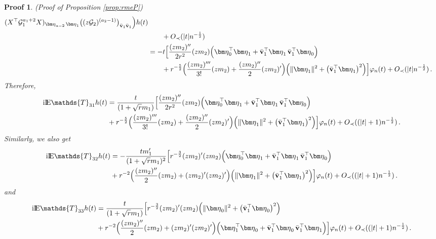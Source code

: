 \documentclass[12pt]{article}
\numberwithin{equation}{section}
\newtheorem{myPro}{Proof}
\theoremstyle{remark}
\newcommand{\1}{{\rm 1}\kern-0.24em{\rm I}}
\newcommand{\E}{{\rm I}\kern-0.18em{\rm E}}
\begin{document}
\begin{appendices}
\begin{myPro}{(Proof of Proposition  \ref{prop:rmeP})}
{\begin{align*}
({X}^{\top} \mathcal{G}_1^{a_1+2}{X})_{ {\bm \eta}_{a-2}\, {\bm \eta}_1} \big( (z\mathcal{G}_2)^{(a_2-1)}\big)_{\bar{\bf v}_1 \bar{\bf v}_1 } \Big)h(t) \notag\\
&\qquad + O_\prec(|t|n^{-\frac 12})\nonumber\\
&= - t\Big[ \frac{(zm_2)''}{2r^2} (zm_2) \Big( {\bm \eta}_{0}^{\top} {\bm \eta}_1+ \bar{\bf v}_1^{\top} {\bm \eta}_1\, \bar{\bf v}_1^{\top} {\bm \eta}_{0}\Big) \notag\\
&\qquad + r^{-\frac 52}\Big( \frac{(zm_2)'''}{3!} (zm_2)  + \frac{(zm_2)''}{2} (zm_2)'  \Big) \Big( \Vert {\bm \eta}_{1}\Vert^2+\big( \bar{\bf v}_1^{\top} {\bm \eta}_1\big)^2 \Big)  \Big]\varphi_n(t) + O_\prec(|t|n^{-\frac 12})\,.
 \end{align*}
 }
 Therefore, 
 \begin{align}\label{est:ET31P}
  \mathrm{i}\E\mathds{T}_{31}h(t) & =  \frac{t}{(1+\sqrt r m_1)}\Big[ \frac{(zm_2)''}{2r^2} (zm_2) \Big( {\bm \eta}_{0}^{\top} {\bm \eta}_1+ \bar{\bf v}_1^{\top} {\bm \eta}_1\,\bar{\bf v}_1^{\top} {\bm \eta}_{0}\Big) \notag\\
&+ r^{-\frac 52} \Big( \frac{(zm_2)'''}{3!} (zm_2)  + \frac{(zm_2)''}{2} (zm_2)'  \Big) \Big( \Vert {\bm \eta}_1\Vert^2+\big( \bar{\bf v}_1^{\top} {\bm \eta}_1\big)^2\Big)  \Big]\varphi_n(t)+ O_\prec((|t|+1)n^{-\frac 12})\,.
 \end{align}
 Similarly, we also get 
 \begin{align}\label{est:ET32P}
 \mathrm{i} \E\mathds{T}_{32}h(t) &=  -\frac{tm_1'}{(1+\sqrt r m_1)^2}\Big[ r^{-\frac 32} {(zm_2)'} (zm_2) \Big( {\bm \eta}_{0}^{\top} {\bm \eta}_1+ \bar{\bf v}_1^{\top} {\bm \eta}_1\, \bar{\bf v}_1^{\top} {\bm \eta}_{0}\Big) \notag\\
& + r^{-2}\Big( \frac{(zm_2)''}{2} (zm_2)  + {(zm_2)'}(zm_2)'  \Big) \Big( \Vert{\bm \eta}_1\Vert^2+\big( \bar{\bf v}_1^{\top} {\bm \eta}_1\big)^2\Big)  \Big]\varphi_n(t) + O_\prec((|t|+1)n^{-\frac 12})\,.
 \end{align}
 and 
  \begin{align}\label{est:ET33P}
\mathrm{i}  \E\mathds{T}_{33} h(t) & =   \frac{t}{(1+\sqrt r m_1)}\Big[r^{-\frac 32}{(zm_2)'} (zm_2) \Big(\Vert {\bm \eta}_{0}\Vert^2+\big(  \bar{\bf v}_1^{\top} {\bm \eta}_{0}\big)^2\Big) \notag\\
&+ r^{-2} \Big( \frac{(zm_2)''}{2} (zm_2)  + {(zm_2)'}(zm_2)'  \Big)\Big( {\bm \eta}_{1}^{\top} {\bm \eta}_0+ \bar{\bf v}_1^{\top} {\bm \eta}_0\, \bar{\bf v}_1^{\top} {\bm \eta}_{1}\Big)  \Big]\varphi_n(t) + O_\prec((|t|+1)n^{-\frac 12})\,.
 \end{align}
 

\end{myPro}
\end{appendices}
\end{document}
